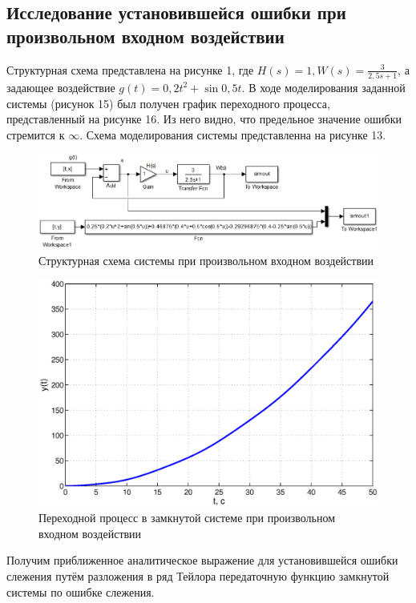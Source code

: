 \documentclass[12pt,a4paper]{article}
\begin{document}
\newpage
\begin{center}
\section{Исследование установившейся ошибки при произвольном входном воздействии}
\end{center}\par
 Структурная схема представлена на рисунке 1, где $H(s) = 1, W(s) = \displaystyle{\frac{3}{2,5s + 1}}$, а задающее воздействие $g(t) = 0,2t^2 + \sin{0,5t}$.
 В ходе моделирования заданной системы (рисунок 15) был получен график переходного процесса, представленный на рисунке 16. Из него видно, что предельное значение ошибки стремится к $\infty$. Схема моделирования системы представленна на рисунке 13.
\begin{figure}[H]
    \centering
    \includegraphics[width=1\linewidth]{cxema4.eps}
    \caption{Структурная схема системы при произвольном входном воздействии}
\end{figure}
\begin{figure}[H]
    \centering
    \includegraphics[width=1\linewidth]{4.1.eps}
    \caption{Переходной процесс в замкнутой системе при произвольном входном воздействии}
\end{figure}
Получим приближенное аналитическое выражение для установившейся ошибки слежения путём разложения в ряд Тейлора передаточную функцию замкнутой системы по ошибке слежения.
\end{document}
